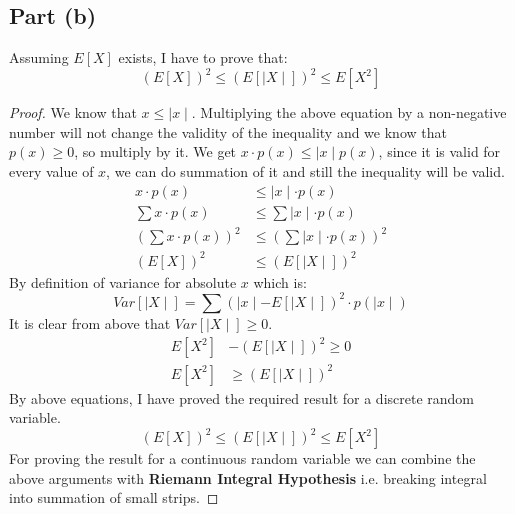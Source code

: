 \documentclass{article}
\let\bold\textbf
\begin{document}
{  \subsection{Part (b)}{
    Assuming $E[X]$ exists, I have to prove that: $$ (E[X])^2 \leq (E[\mid X \mid])^2 \leq E[X^2] $$
    \begin{proof}
      We know that $x \leq \mid x \mid$. \newline
      Multiplying the above equation by a non-negative number will not change the validity of the inequality and we know that $p(x) \geq 0$, so multiply by it. \newline
      We get $x \cdot p(x) \leq \mid x \mid p(x)$, since it is valid for every value of $x$, we can do summation of it and still the inequality will be valid.
      \begin{align*}
        x \cdot p(x) &\leq \mid x \mid \cdot p(x) \\
        \sum x \cdot p(x) &\leq \sum \mid x \mid \cdot p(x) \\
        \left( \sum x \cdot p(x) \right)^2 &\leq \left( \sum \mid x \mid \cdot p(x) \right)^2 \\
        (E[X])^2 &\leq (E[\mid X \mid])^2
      \end{align*}
      By definition of variance for absolute $x$ which is: $$ Var[\mid X \mid] = \sum (\mid x \mid - E[\mid X \mid])^2 \cdot p(\mid x \mid) $$
      It is clear from above that $Var[\mid X \mid] \geq 0$.
      \begin{align*}
        E[X^2] &- (E[\mid X \mid])^2 \geq 0 \\
        E[X^2] &\geq (E[\mid X \mid])^2
      \end{align*}
      By above equations, I have proved the required result for a discrete random variable. $$ (E[X])^2 \leq (E[\mid X \mid])^2 \leq E[X^2] $$
      For proving the result for a continuous random variable we can combine the above arguments with \bold{Riemann Integral Hypothesis} i.e. breaking integral into summation of small strips.
    \end{proof}
  }
}
\end{document}
